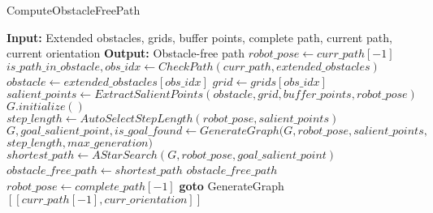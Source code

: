 \begin{algorithm}[H]
    \caption{ComputeObstacleFreePath}
    \begin{algorithmic}[1]
        \Statex \textbf{Input:} Extended obstacles, grids, buffer points, complete path, current path, current orientation
        \Statex \textbf{Output:} Obstacle-free path
        \newline
        \State $robot\_pose \gets curr\_path[-1]$
        \State $is\_path\_in\_obstacle, obs\_idx \gets CheckPath(curr\_path, extended\_obstacles)$
            \State $obstacle \gets extended\_obstacles[obs\_idx]$
            \State $grid \gets grids[obs\_idx]$
            \State $salient\_points \gets ExtractSalientPoints(obstacle, grid, buffer\_points, robot\_pose)$
            \State $G.initialize()$
            \State $step\_length \gets AutoSelectStepLength(robot\_pose, salient\_points)$
            \State $G, goal\_salient\_point, is\_goal\_found \gets GenerateGraph(G, robot\_pose, salient\_points,$ 
            \Statex \hspace{9cm} $step\_length, max\_generation)$
                \State $shortest\_path \gets AStarSearch(G, robot\_pose, goal\_salient\_point)$
                \State $obstacle\_free\_path \gets shortest\_path$
                \State \Return $obstacle\_free\_path$
            \Else
                \State $robot\_pose \gets complete\_path[-1]$  
                \State \textbf{goto} GenerateGraph
            \EndIf
        \Else
            \State \Return $[[curr\_path[-1], curr\_orientation]]$
        \EndIf
    \end{algorithmic}
\end{algorithm}


